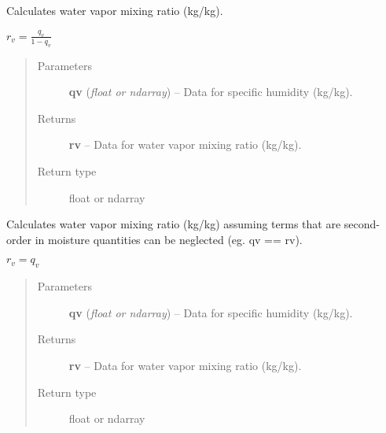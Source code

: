 \documentclass[letterpaper,10pt,english]{sphinxmanual}
\begin{document}

\begin{fulllineitems}
\label{atmos:atmos.equations.rv_from_qv}
Calculates water vapor mixing ratio (kg/kg).

\(r_v = \frac{q_v}{1-q_v}\)
\begin{quote}\begin{description}
\item[{Parameters}] \leavevmode
\textbf{qv} (\emph{float or ndarray}) -- Data for specific humidity (kg/kg).

\item[{Returns}] \leavevmode
\textbf{rv} --
Data for water vapor mixing ratio (kg/kg).

\item[{Return type}] \leavevmode
float or ndarray

\end{description}\end{quote}

\end{fulllineitems}


\begin{fulllineitems}
\label{atmos:atmos.equations.rv_from_qv_lwv}
Calculates water vapor mixing ratio (kg/kg) assuming terms that are second-order
in moisture quantities can be neglected (eg. qv == rv).

\(r_v = q_v\)
\begin{quote}\begin{description}
\item[{Parameters}] \leavevmode
\textbf{qv} (\emph{float or ndarray}) -- Data for specific humidity (kg/kg).

\item[{Returns}] \leavevmode
\textbf{rv} --
Data for water vapor mixing ratio (kg/kg).

\item[{Return type}] \leavevmode
float or ndarray

\end{description}\end{quote}

\end{fulllineitems}
\end{document}
